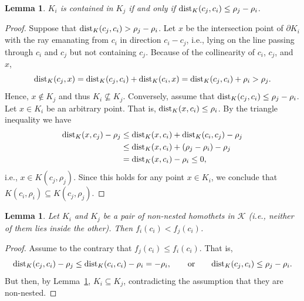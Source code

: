 \documentclass[11pt]{article}
\def\reals{{\mathbb R}}
\def\bd{{\partial}}
\def\dist{{\rm dist}}
\def\F{\mathcal{F}}
\def\K{\mathcal{K}}
\newtheorem{lemma}[theorem]{Lemma}
\theoremstyle{definition}
\begin{document}
\iffullver
\begin{lemma}
\label{lem:nested}
$K_i$ is contained in $K_j$ if and only if $\dist_K(c_j,c_i) \le \rho_j -\rho_i$.
\end{lemma}
\begin{proof}
Suppose that $\dist_K(c_j,c_i) > \rho_j -\rho_i$. Let $x$ be the intersection point of 
$\bd K_i$ with the ray emanating from $c_i$ in direction $c_i-c_j$, i.e., lying on the 
line passing through $c_i$ and $c_j$ but not containing $c_j$. Because of the collinearity 
of $c_i$, $c_j$, and $x$,
\[ 
\dist_K(c_j, x) = \dist_K(c_j,c_i) + \dist_K(c_i,x) = \dist_K(c_j,c_i)+\rho_i > \rho_j.
\]
Hence, $x\not\in K_j$ and thus $K_i \not\subseteq K_j$. Conversely, assume 
that $\dist_K(c_j,c_i) \le \rho_j -\rho_i$.
Let $x\in K_i$ be an arbitrary point. That is, $\dist_K(x,c_i) \le \rho_i$.
By the triangle inequality we have
\begin{align*} 
	\dist_K(x,c_j) - \rho_j & \le \dist_K(x,c_i) + \dist_K(c_i,c_j) - \rho_j \\
		& \le \dist_K(x,c_i) + (\rho_j - \rho_i) - \rho_j \\
		& = \dist_K(x,c_i) - \rho_i \le 0,
\end{align*}
i.e., $x\in K(c_j,\rho_j)$. Since this holds for any point $x\in K_i$, we conclude that
$K(c_i,\rho_i) \subseteq K(c_j,\rho_j)$.
\end{proof}

\begin{lemma} \label{lem:c0in}
	Let $K_i$ and $K_j$ be a pair of non-nested homothets in $\K$ (i.e., neither of them lies inside the other). Then $f_i(c_i) < f_j(c_i)$.
\end{lemma}
\begin{proof}
	Assume to the contrary that $f_j(c_i) \le f_i(c_i)$.
	That is,
\[
\dist_K(c_j,c_i) - \rho_j \le \dist_K(c_i,c_i) - \rho_i = -\rho_i , \qquad\text{or}\qquad
\dist_K(c_j,c_i) \le \rho_j -\rho_i .
\]
But then, by Lemma~\ref{lem:nested}, $K_i \subseteq K_j$, contradicting the assumption that they
are non-nested.
\end{proof}
\fi
\end{document}
